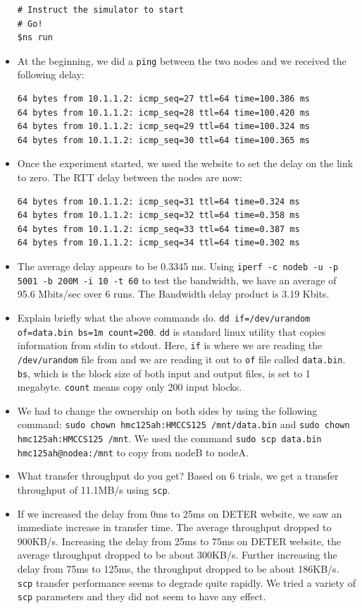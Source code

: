 \documentclass[10pt]{article}
\begin{document}
\begin{itemize}
\begin{lstlisting}
# Instruct the simulator to start
# Go!
$ns run
\end{lstlisting}
\item At the beginning, we did a \texttt{ping} between the two nodes and we received the following delay:
\begin{lstlisting}
64 bytes from 10.1.1.2: icmp_seq=27 ttl=64 time=100.386 ms
64 bytes from 10.1.1.2: icmp_seq=28 ttl=64 time=100.420 ms
64 bytes from 10.1.1.2: icmp_seq=29 ttl=64 time=100.324 ms
64 bytes from 10.1.1.2: icmp_seq=30 ttl=64 time=100.365 ms
\end{lstlisting}
\item Once the experiment started, we used the website to set the delay on the link to zero. The RTT delay between the nodes are now:
\begin{lstlisting}
64 bytes from 10.1.1.2: icmp_seq=31 ttl=64 time=0.324 ms
64 bytes from 10.1.1.2: icmp_seq=32 ttl=64 time=0.358 ms
64 bytes from 10.1.1.2: icmp_seq=33 ttl=64 time=0.387 ms
64 bytes from 10.1.1.2: icmp_seq=34 ttl=64 time=0.302 ms
\end{lstlisting}
\item The average delay appears to be 0.3345 ms.  Using \texttt{iperf -c nodeb -u -p 5001 -b 200M -i 10 -t 60} to test the bandwidth, we have an average of 95.6 Mbits/sec over 6 runs. The Bandwidth delay product is 3.19 Kbits.
\item Explain briefly what the above commands do.  \texttt{dd if=/dev/urandom of=data.bin bs=1m count=200}.  \texttt{dd} is standard linux utility that copies information from stdin to stdout.  Here, \texttt{if} is where we are reading the \texttt{/dev/urandom} file from and we are reading it out to \texttt{of} file called \texttt{data.bin}.  \texttt{bs}, which is the block size of both input and output files, is set to 1 megabyte. \texttt{count} means copy only 200 input blocks.
\item We had to change the ownership on both sides by using the following command: \texttt{sudo chown hmc125ah:HMCCS125 /mnt/data.bin} and \texttt{sudo chown hmc125ah:HMCCS125 /mnt}.  We used the command \texttt{sudo scp data.bin hmc125ah@nodea:/mnt} to copy from nodeB to nodeA.
\item What transfer throughput do you get?  Based on 6 trials, we get a transfer throughput of 11.1MB/s using \texttt{scp}.
\item If we increased the delay from 0ms to 25ms on DETER website, we saw an immediate increase in transfer time.  The average throughput dropped to 900KB/s.  Increasing the delay from 25ms to 75ms on DETER website, the average throughput dropped to be about 300KB/s.  Further increasing the delay from 75ms to 125ms, the throughput dropped to be about 186KB/s.  \texttt{scp} transfer performance seems to degrade quite rapidly.  We tried a variety of \texttt{scp} parameters and they did not seem to have any effect.

\end{itemize}
\end{document}
